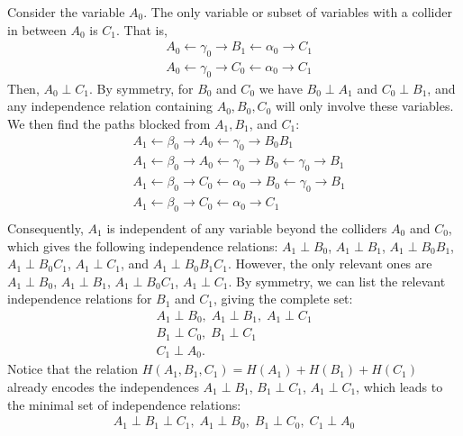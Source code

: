 \documentclass[reprint,pra, twocolumn, amsmath,amssymb,
 aps,superscriptaddress,]{revtex4-2}
\begin{document}
Consider the variable $A_0$. The only variable or subset of variables with a collider in between $A_0$ is $C_1$. That is,
%
\begin{align}
    &A_0 \longleftarrow \gamma_0 \longrightarrow B_1 \longleftarrow \alpha_0 \longrightarrow C_1 \nonumber\\
    &A_0 \longleftarrow \gamma_0 \longrightarrow C_0 \longleftarrow \alpha_0 \longrightarrow C_1
\end{align}
%
Then, $A_0\perp C_1$. By symmetry, for $B_0$ and $C_0$ we have $B_0\perp A_1$ and $C_0\perp B_1$, and any independence relation containing $A_0, B_0, C_0$ will only involve these variables. We then find the paths blocked from $A_1,B_1$, and $C_1$:
%
\begin{align}
    &A_1 \longleftarrow \beta_0 \longrightarrow A_0 \longleftarrow \gamma_0 \longrightarrow B_0 B_1 \nonumber\\
    &A_1 \longleftarrow \beta_0 \longrightarrow A_0 \longleftarrow \gamma_0 \longrightarrow B_0  \longleftarrow \gamma_0 \longrightarrow B_1 \nonumber\\
    &A_1 \longleftarrow \beta_0 \longrightarrow C_0 \longleftarrow \alpha_0 \longrightarrow B_0  \longleftarrow \gamma_0 \longrightarrow B_1 \nonumber\\
    &A_1 \longleftarrow \beta_0 \longrightarrow C_0 \longleftarrow \alpha_0 \longrightarrow C_1 \nonumber\\
\end{align}
%
Consequently, $A_1$ is independent of any variable beyond the colliders $A_0$ and $C_0$, which gives the following independence relations: $A_1\perp B_0$, $A_1\perp B_1$, $A_1\perp B_0B_1$, $A_1\perp B_0C_1$, $A_1\perp C_1$, and $A_1\perp B_0B_1C_1$. However, the only relevant ones are $A_1\perp B_0$, $A_1\perp B_1$, $A_1\perp B_0C_1$, $A_1\perp C_1$. By symmetry, we can list the relevant independence relations for $B_1$ and $C_1$, giving the complete set:
%
\begin{align}
    A_1\perp B_0, \; A_1\perp B_1, \; A_1\perp C_1\nonumber\\
    B_1\perp C_0, \; B_1\perp C_1\\
    C_1\perp A_0.\nonumber
\end{align}
Notice that the relation $H(A_1,B_1, C_1) = H(A_1)+H(B_1)+H(C_1)$ already encodes the independences $A_1\perp B_1$, $B_1\perp C_1$, $A_1\perp C_1$, which leads to the minimal set of independence relations:
%
\begin{align}
    A_1\perp B_1 \perp C_1, \; A_1\perp B_0, \; B_1\perp C_0, \; C_1\perp A_0\nonumber
\end{align}
%
\end{document}
